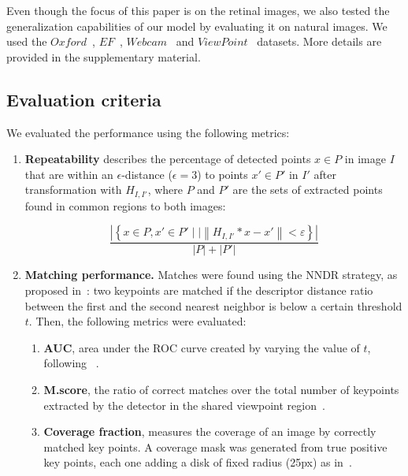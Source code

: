 Even though the focus of this paper is on the retinal images, we also tested the generalization capabilities of our model by evaluating it on natural images. We used the $Oxford$~\cite{oxford}, $EF$~\cite{Zitnik}, $Webcam$~\cite{Verdie2015, Jacobs2007} and $ViewPoint$~\cite{Yi2015} datasets. More details are provided in the supplementary material.

\subsection{Evaluation criteria}

We evaluated the performance using the following metrics:
\begin{enumerate}
    \item \textbf{Repeatability} describes the percentage of detected points $x \in P$ in image $I$ that are within an $\epsilon$-distance ($\epsilon=3$) to points $x' \in P'$ in $I'$ after transformation with $H_{I,I'}$, where $P$ and $P'$ are the sets of extracted points found in common regions to both images:

\begin{equation}
    \frac{\left | \left \{ x \in P, x' \in P'  \mid | \left \| H_{I,I'}*x - x' \right \| <\varepsilon\right \} \right |}{\left | P \right | + \left | P' \right |}
\end{equation}

    \item \textbf{Matching performance.} Matches were found using the \ac{NNDR} strategy, as proposed in~\cite{Lowe2004}: two keypoints are matched if the descriptor distance ratio between the first and the second nearest neighbor is below a certain threshold $t$.  Then, the following metrics were evaluated:
    
\begin{enumerate}[label=(\alph*)]
    \item \textbf{AUC}, area under the ROC curve created by varying the value of $t$, following ~\cite{Dahl2011,Winder,Windera}.  
    
    \item \textbf{M.score}, the ratio of correct matches over the total number of keypoints extracted by the detector in the shared viewpoint region~\cite{Mikolajczyk2005}.
    
    \item \textbf{Coverage fraction}, measures the coverage of an image by correctly matched key points. A coverage mask was generated from true positive key points, each one adding a disk of fixed radius (25px) as in~\cite{Aldana-iuit}. 
\end{enumerate}


\end{enumerate}
